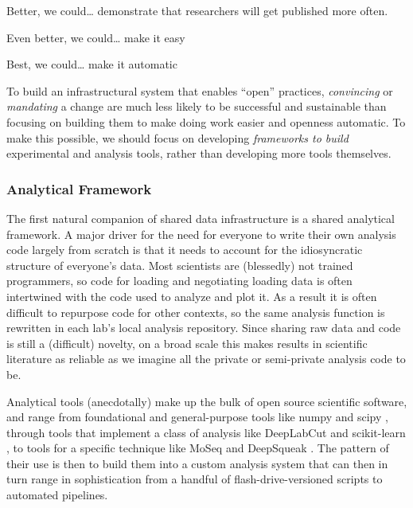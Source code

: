 \documentclass[10pt]{article}
\begin{document}
\begin{multicols}{2}
\begin{leftbar}
Better, we could\ldots{} demonstrate that researchers will get published
more often.

Even better, we could\ldots{} make it easy

Best, we could\ldots{} make it automatic \cite{spiesWorkflowCentricApproachIncreasing2017} 
\end{leftbar}

To build an infrastructural system that enables ``open'' practices,
\emph{convincing} or \emph{mandating} a change are much less likely to
be successful and sustainable than focusing on building them to make
doing work easier and openness automatic. To make this possible, we
should focus on developing \emph{frameworks to build} experimental and
analysis tools, rather than developing more tools themselves.

\hypertarget{analytical-framework}{%
\subsubsection{Analytical Framework}\label{analytical-framework}}

The first natural companion of shared data infrastructure is a shared
analytical framework. A major driver for the need for everyone to write
their own analysis code largely from scratch is that it needs to account
for the idiosyncratic structure of everyone's data. Most scientists are
(blessedly) not trained programmers, so code for loading and negotiating
loading data is often intertwined with the code used to analyze and plot
it. As a result it is often difficult to repurpose code for other
contexts, so the same analysis function is rewritten in each lab's local
analysis repository. Since sharing raw data and code is still a
(difficult) novelty, on a broad scale this makes results in scientific
literature as reliable as we imagine all the private or semi-private
analysis code to be.

Analytical tools (anecdotally) make up the bulk of open source
scientific software, and range from foundational and general-purpose
tools like numpy \cite{harrisArrayProgrammingNumPy2020}  and
scipy \cite{virtanenSciPyFundamentalAlgorithms2020} , through
tools that implement a class of analysis like DeepLabCut \cite{mathisDeepLabCutMarkerlessPose2018a}  and scikit-learn \cite{pedregosaScikitlearnMachineLearning2011} , to tools for a specific
technique like MoSeq \cite{wiltschkoRevealingStructurePharmacobehavioral2020}  and DeepSqueak
\cite{coffeyDeepSqueakDeepLearningbased2019} . The pattern of
their use is then to build them into a custom analysis system that can
then in turn range in sophistication from a handful of
flash-drive-versioned scripts to automated pipelines.


\end{multicols}
\end{document}
